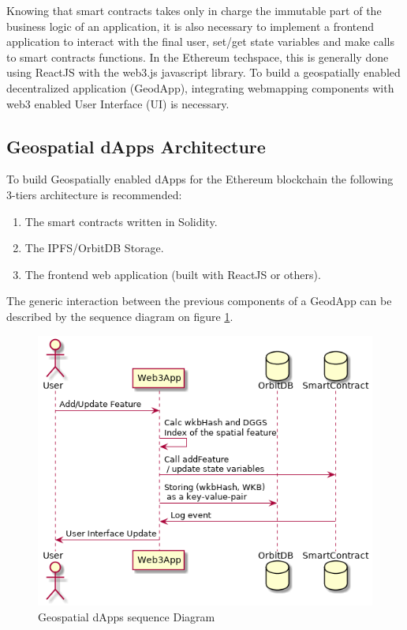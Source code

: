 \documentclass{isprs} %
\begin{document}
Knowing that smart contracts takes only in charge the immutable part of the business logic of an application, it is also necessary to implement a frontend application to interact with the final user, set/get state variables and make calls to smart contracts functions. In the Ethereum techspace, this is generally done using ReactJS with the web3.js javascript library. To build a geospatially enabled decentralized application (GeodApp), integrating webmapping components with web3 enabled User Interface (UI) is necessary.
 
\subsection{Geospatial dApps Architecture}\label{sec:Geospatial dApps Architecture}

To build Geospatially enabled dApps for the Ethereum blockchain the following 3-tiers architecture is recommended:

\begin{enumerate}
\setlength\itemsep{0em}\setlength\parskip{0em}\setlength\topsep{0em}\setlength\partopsep{0em}\setlength\parsep{0em} 
\item{The smart contracts written in Solidity.} 
\item{The IPFS/OrbitDB Storage.}
\item{The frontend web application (built with ReactJS or others).}
\end{enumerate}

The generic interaction between the previous components of a GeodApp can be described by the sequence diagram on figure \ref{fig:figure_geo_dapps_seq}.

\begin{figure}[ht!]
\begin{center}
		\includegraphics[width=1.0\columnwidth]{figures/seq-geospatial-dapps.png}
	\caption{Geospatial dApps sequence Diagram}
\label{fig:figure_geo_dapps_seq}
\end{center}
\end{figure}
\end{document}
